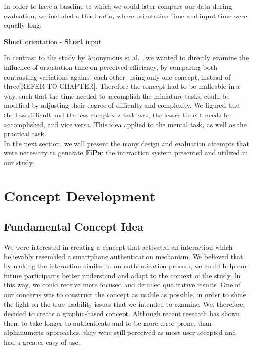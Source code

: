 In order to have  a baseline to which we could later compare our data during evaluation, we included a third ratio, where orientation time and input time were equally long:  
\begin{center}
\textbf{Short} orientation - \textbf{Short} input
\end{center} 

In contrast to the study by Anonymous et al. \cite{anonymous}, we wanted to directly examine the influence of orientation time on perceived efficiency, by comparing both contrasting variations against each other, using only one concept, instead of three[REFER TO CHAPTER]. Therefore the concept had to be malleable in a way, such that the time needed to accomplish the miniature tasks, could be modified by adjusting their degree of difficulty and complexity. We figured that the less difficult and the less complex a task was, the lesser time it needs be accomplished, and vice versa. This idea applied to the mental task, as well as the practical task. \\
In the next section, we will present the many design and evaluation attempts that were necessary to generate \underline{\textbf{FiPa}}: the interaction system presented and utilized in our study. 

\section{Concept Development}

\subsection{Fundamental Concept Idea}
We were interested in creating a concept that activated an interaction which believably resembled a smartphone authentication mechanism. We believed that by making the interaction similar to an authentication process, we could help our future participants better understand and adapt to the context of the study. In this way, we could receive more focused and detailed qualitative results. One of our concerns was to construct the concept as usable as possible, in order to shine the light on the true usability issues that we intended to examine. We, therefore, decided to create a graphic-based concept. Although recent research has shown them to take longer to authenticate and to be more error-prone, than alphanumeric approaches, they were still perceived as most user-accepted and had a greater easy-of-use.\\

